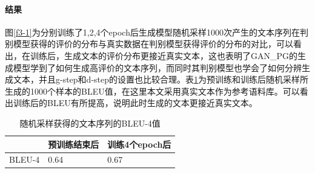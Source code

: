 \paragraph{结果}
图\ref{f3-1}为分别训练了1,2,4个epoch后生成模型随机采样1000次产生的文本序列在判别模型获得的评价的分布与真实数据在判别模型获得评价的分布的对比，可以看出，在训练后，生成文本的评价分布更接近真实文本，这也表明了GAN\_PG的生成模型学到了如何生成高评价的文本序列，而同时其判别模型也学会了如何分辨生成文本，并且g-step和d-step的设置也比较合理。表\ref{t3-5}为预训练和训练后随机采样所生成的1000个样本的BLEU值，在这里本文采用真实文本作为参考语料库。可以看出训练后的BLEU有所提高，说明此时生成的文本更接近真实文本。
\begin{table}[htb]
    \center
    \caption{\label{t3-5}随机采样获得的文本序列的BLEU-4值}
    \begin{tabular*}{\linewidth}{p{.33\linewidth}p{.33\linewidth}p{.33\linewidth}}
\toprule
&预训练结束后&训练4个epoch后\\
\midrule
BLEU-4&0.64&0.67\\
\bottomrule
    \end{tabular*}
\end{table}
